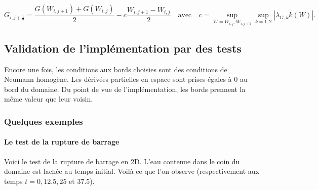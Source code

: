 \documentclass[
11pt, %
francais, %
singlespacing, %
headsepline, %
f%
]{MastersDoctoralThesis} %
\theoremstyle{definition}
\begin{document}
$$ G_{i,j+\frac{1}{2}} =  \frac{ G(W_{i,j+1}) + G(W_{i,j}) }{2} - c \frac{ W_{i,j+1} - W_{i,j} }{2} \quad \text{avec} \quad c = \sup_{W =  W_{i,j} ,  W_{i,j+1}} \sup_{k = 1,2} | \lambda _{G,k}k(W) | .$$

\subsection{Validation de l'implémentation par des tests}

Encore une fois, les conditions aux bords choisies sont des conditions de Neumann homogène. Les dérivées partielles en espace sont prises égales à $0$ au bord du domaine.
Du point de vue de l'implémentation, les bords prennent la même valeur que leur voisin.

\subsubsection{Quelques exemples}

\paragraph{Le test de la rupture de barrage}

\medskip

Voici le test de la rupture de barrage en 2D. L'eau contenue dans le coin du domaine est lachée au temps initial. Voilà ce que l'on observe (respectivement aux temps $t=0, 12.5, 25$ et $37.5$).

\medskip
\end{document}
